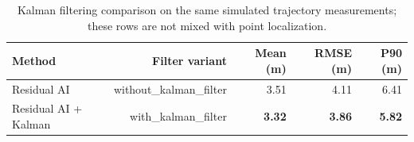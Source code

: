\begin{table}[t]
\centering
\caption{Kalman filtering comparison on the same simulated trajectory measurements; these rows are not mixed with point localization.}
\label{tab:trajectory_filtering}
\small
\begin{tabular}{lrrrr}
\toprule
Method & Filter variant & Mean (m) & RMSE (m) & P90 (m) \\
\midrule
Residual AI & without\_kalman\_filter & 3.51 & 4.11 & 6.41 \\
Residual AI + Kalman & with\_kalman\_filter & \textbf{3.32} & \textbf{3.86} & \textbf{5.82} \\
\bottomrule
\end{tabular}
\end{table}
